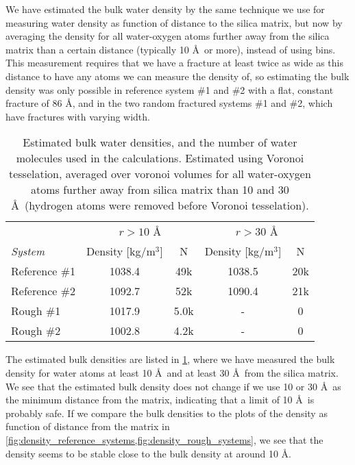 We have estimated the bulk water density by the same technique we use for measuring water density as function of distance to the silica matrix, but now by averaging the density for all water-oxygen atoms further away from the silica matrix than a certain distance (typically 10 \AA\ or more), instead of using bins. This measurement requires that we have a fracture at least twice as wide as this distance to have any atoms we can measure the density of, so estimating the bulk density was only possible in reference system \#1 and \#2 with a flat, constant fracture of 86 \AA, and in the two random fractured systems \#1 and \#2, which have fractures with varying width. %
%
\begin{table}[!htb]%
    \centering%
    \begin{tabular}{l|cc|cc}%
    ~               & \multicolumn{2}{c|}{$r>10$ \AA}& \multicolumn{2}{c}{$r>30$ \AA}    \\
    \textit{System} & Density [kg/m$^3$]    & N     & Density [kg/m$^3$]    & N   \\ \hline
    Reference \#1   & 1038.4                & 49k   & 1038.5                & 20k \\
    Reference \#2   & 1092.7                & 52k   & 1090.4                & 21k \\
    Rough \#1       & 1017.9                & 5.0k  & -                     & 0   \\
    Rough \#2       & 1002.8                & 4.2k  & -                     & 0   \\
    \end{tabular}%
    \vspace{8pt}%
    \caption{%
        Estimated bulk water densities, and the number of water molecules used in the calculations. Estimated using Voronoi tesselation, averaged over voronoi volumes for all water-oxygen atoms further away from silica matrix than 10 and 30 \AA\ (hydrogen atoms were removed before Voronoi tesselation). %
        \label{tab:bulk_water_density}%
    }%
\end{table}%

The estimated bulk densities are listed in \cref{tab:bulk_water_density}, where we have measured the bulk density for water atoms at least 10 \AA\ and at least 30 \AA\ from the silica matrix. We see that the estimated bulk density does not change if we use 10 or 30 \AA\ as the minimum distance from the matrix, indicating that a limit of 10 \AA\ is probably safe. If we compare the bulk densities to the plots of the density as function of distance from the matrix in \cref{fig:density_reference_systems,fig:density_rough_systems}, we see that the density seems to be stable close to the bulk density at around 10 \AA.

